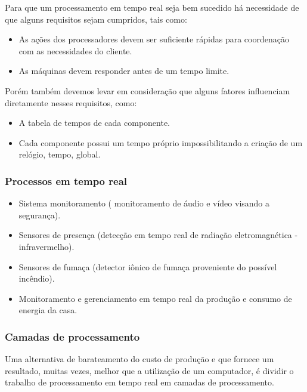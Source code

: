 	Para que um processamento em tempo real seja bem sucedido há necessidade de que alguns requisitos sejam cumpridos, tais como:

\begin{itemize}
	\item As ações dos processadores devem ser suficiente rápidas para coordenação com as necessidades do cliente.
	\item As máquinas devem responder antes de um tempo limite.
\end{itemize}

	Porém também devemos levar em consideração que alguns fatores influenciam diretamente nesses requisitos, como:

\begin{itemize}
	\item A tabela de tempos de cada componente.
	\item Cada componente possui um tempo próprio impossibilitando a criação de um relógio, tempo, global.
\end{itemize}

\subsubsection{Processos em tempo real}

\begin{itemize}
	\item Sistema monitoramento ( monitoramento de áudio e vídeo visando a segurança).
	\item Sensores de presença (detecção em tempo real de radiação eletromagnética - infravermelho).
	\item Sensores de fumaça (detector iônico de fumaça proveniente do possível incêndio).
	\item Monitoramento e gerenciamento em tempo real da produção e consumo de energia da casa. 
\end{itemize}

\subsubsection{Camadas de processamento}
	
	Uma alternativa de barateamento do custo de produção e que fornece um resultado, muitas vezes, melhor que a utilização de um computador, é dividir o trabalho de processamento em tempo real em camadas de processamento.

